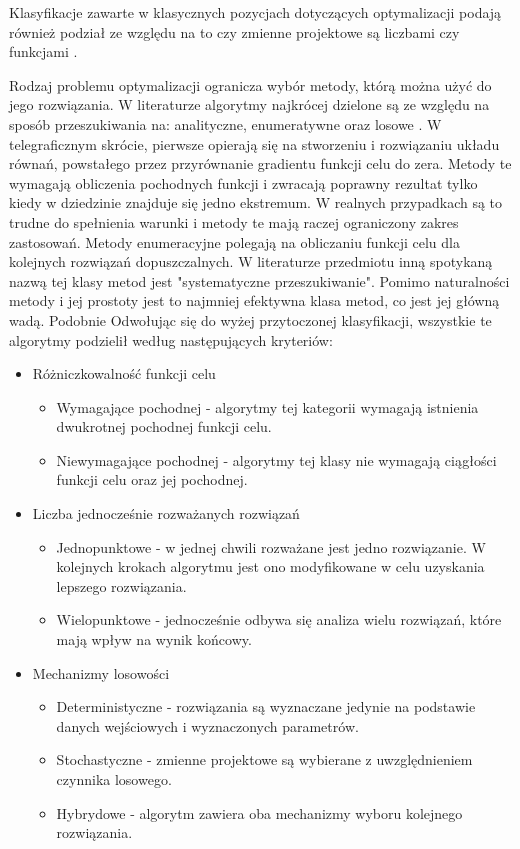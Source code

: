 Klasyfikacje zawarte w klasycznych pozycjach dotyczących optymalizacji podają również podział ze względu na to czy zmienne projektowe są liczbami czy funkcjami \parencite{Szymczak1995,Findeisen1980}.

Rodzaj problemu optymalizacji ogranicza wybór metody, którą można użyć do jego rozwiązania. W literaturze algorytmy najkrócej dzielone są ze względu na sposób przeszukiwania na: analityczne, enumeratywne oraz losowe \parencite{Goldberg1995}. W telegraficznym skrócie, pierwsze opierają się na stworzeniu i rozwiązaniu układu równań, powstałego przez przyrównanie gradientu funkcji celu do zera. Metody te wymagają obliczenia pochodnych funkcji i zwracają poprawny rezultat tylko kiedy w dziedzinie znajduje się jedno ekstremum. W realnych przypadkach są to trudne do spełnienia warunki i metody te mają raczej ograniczony zakres zastosowań. Metody enumeracyjne polegają na obliczaniu funkcji celu dla kolejnych rozwiązań dopuszczalnych. W literaturze przedmiotu inną spotykaną nazwą tej klasy metod jest "systematyczne przeszukiwanie". Pomimo naturalności metody i jej prostoty jest to najmniej efektywna klasa metod, co jest jej główną wadą. Podobnie 
Odwołując się do wyżej przytoczonej klasyfikacji, wszystkie te algorytmy \cite{Tesch2016} podzielił według następujących kryteriów:
\begin{itemize}[noitemsep]
	\item Różniczkowalność funkcji celu
	\begin{itemize}[noitemsep]
		\item Wymagające pochodnej - algorytmy tej kategorii wymagają istnienia dwukrotnej pochodnej funkcji celu.
		\item Niewymagające pochodnej - algorytmy tej klasy nie wymagają ciągłości funkcji celu oraz jej pochodnej.
	\end{itemize}
	\item Liczba jednocześnie rozważanych rozwiązań
	\begin{itemize}[noitemsep]
		\item Jednopunktowe - w jednej chwili rozważane jest jedno rozwiązanie. W kolejnych krokach algorytmu jest ono modyfikowane w celu uzyskania lepszego rozwiązania.
		\item Wielopunktowe - jednocześnie odbywa się analiza wielu rozwiązań, które mają wpływ na wynik końcowy.
	\end{itemize}
	\item Mechanizmy losowości
	\begin{itemize}[noitemsep]
		\item Deterministyczne - rozwiązania są wyznaczane jedynie na podstawie danych wejściowych i wyznaczonych parametrów.
		\item Stochastyczne - zmienne projektowe są wybierane z uwzględnieniem czynnika losowego.
		\item Hybrydowe - algorytm zawiera oba mechanizmy wyboru kolejnego rozwiązania.
	\end{itemize}
\end{itemize}


